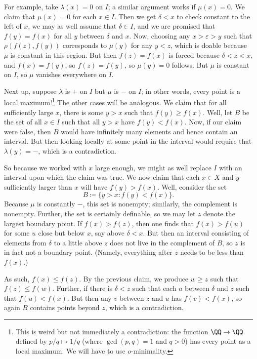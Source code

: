 \documentclass[../notes.tex]{subfiles}
\begin{document}
\begin{enumerate}
	For example, take $\lambda(x)=0$ on $I$; a similar argument works if $\mu(x)=0$. We claim that $\mu(x)=0$ for each $x\in I$. Then we get $\delta<x$ to check constant to the left of $x$, we may as well assume that $\delta\in I$, and we are promised that $f(y)=f(x)$ for all $y$ between $\delta$ and $x$. Now, choosing any $x>\varepsilon>y$ such that $\rho(f(z),f(y))$ corresponds to $\mu(y)$ for any $y<z$, which is doable because $\mu$ is constant in this region. But then $f(z)=f(x)$ is forced because $\delta<z<x$, and $f(x)=f(y)$, so $f(z)=f(y)$, so $\mu(y)=0$ follows. But $\mu$ is constant on $I$, so $\mu$ vanishes everywhere on $I$.

	Next up, suppose $\lambda$ is $+$ on $I$ but $\mu$ is $-$ on $I$; in other words, every point is a local maximum!\footnote{This is weird but not immediately a contradiction: the function $\QQ\to\QQ$ defined by $p/q\mapsto1/q$ (where $\gcd(p,q)=1$ and $q>0$) has every point as a local maximum. We will have to use $o$-minimality.} The other cases will be analogous. We claim that for all sufficiently large $x$, there is some $y>x$ such that $f(y)\ge f(x)$. Well, let $B$ be the set of all $x\in I$ such that all $y>x$ have $f(y)<f(x)$. Now, if our claim were false, then $B$ would have infinitely many elements and hence contain an interval. But then looking locally at some point in the interval would require that $\lambda(y)=-$, which is a contradiction.

	So because we worked with $x$ large enough, we might as well replace $I$ with an interval upon which the claim was true. We now claim that each $x\in X$ and $y$ sufficiently larger than $x$ will have $f(y)>f(x)$. Well, consider the set
	\[B\coloneqq\{y>x:f(y)<f(x)\}.\]
	Because $\mu$ is constantly $-$, this set is nonempty; similarly, the complement is nonempty. Further, the set is certainly definable, so we may let $z$ denote the largest boundary point. If $f(x)>f(z)$, then one finds that $f(x)>f(u)$ for some $u$ close but below $x$, say above $\delta<x$. But then an interval consisting of elements from $\delta$ to a little above $z$ does not live in the complement of $B$, so $z$ is in fact not a boundary point. (Namely, everything after $z$ needs to be less than $f(x)$.)

	As such, $f(x)\le f(z)$. By the previous claim, we produce $w\ge z$ such that $f(z)\le f(w)$. Further, if there is $\delta<z$ such that each $u$ between $\delta$ and $z$ such that $f(u)<f(x)$. But then any $v$ between $z$ and $u$ has $f(v)<f(x)$, so again $B$ contains points beyond $z$, which is a contradiction.


\end{enumerate}
\end{document}
